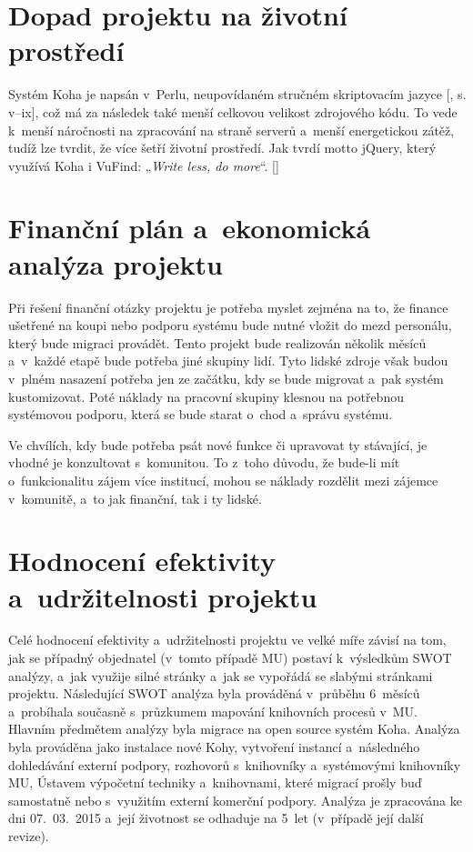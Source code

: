 \documentclass[
	11pt, oneside, printed, final, palatino
	microtype,
	table,   %
	lof,     %
	lot     %
]{fithesis3}
\makeatletter
\newcommand{\citepages}[2]{[\cite{#2}, s. #1]}
\newcommand{\citesource}[1]{[\cite{#1}]}
\newcommand{\citace}[1]{„\textit{#1}“} %
\makeatother
\begin{document}
{\section{Dopad projektu na životní prostředí}
Systém Koha je napsán v~Perlu, neupovídaném stručném skriptovacím jazyce \citepages{v–ix}{Wall1997}, což má za následek také menší celkovou velikost zdrojového kódu. To vede k~menší náročnosti na zpracování na straně serverů a~menší energetickou zátěž, tudíž lze tvrdit, že více šetří životní prostředí. Jak tvrdí motto jQuery, který využívá Koha i VuFind: \citace{Write less, do more}. \citesource{jquery_2016}

\section{Finanční plán a~ekonomická analýza projektu}
Při řešení finanční otázky projektu je potřeba myslet zejména na to, že finance ušetřené na koupi nebo podporu systému bude nutné vložit do mezd personálu, který bude migraci provádět. Tento projekt bude realizován několik měsíců a~v~každé etapě bude potřeba jiné skupiny lidí. Tyto lidské zdroje však budou v~plném nasazení potřeba jen ze začátku, kdy se bude migrovat a~pak systém kustomizovat. Poté náklady na pracovní skupiny klesnou na potřebnou systémovou podporu, která se bude starat o~chod a~správu systému.

Ve chvílích, kdy bude potřeba psát nové funkce či upravovat ty stávající, je vhodné je konzultovat s~komunitou. To z~toho důvodu, že bude-li mít o~funkcionalitu zájem více institucí, mohou se náklady rozdělit mezi zájemce v~komunitě, a~to jak finanční,  tak i ty lidské.

\section{Hodnocení efektivity a~udržitelnosti projektu}
Celé hodnocení efektivity a~udržitelnosti projektu ve velké míře závisí na tom, jak se případný objednatel (v~tomto případě MU) postaví k~výsledkům SWOT analýzy, a~jak využije silné stránky a~jak se vypořádá se slabými stránkami projektu. Následující SWOT analýza byla prováděná v~průběhu 6~měsíců a~probíhala současně s~průzkumem mapování knihovních procesů v~MU. Hlavním předmětem analýzy byla migrace na open source systém Koha. Analýza byla prováděna jako instalace nové Kohy, vytvoření instancí a~následného dohledávání externí podpory, rozhovorů s~knihovníky a~systémovými knihovníky MU, Ústavem výpočetní techniky a~knihovnami, které migrací prošly buď samostatně nebo s~využitím externí komerční podpory. Analýza je zpracována ke dni 07.~03.~2015 a~její životnost se odhaduje na 5~let (v~případě její další revize).

}
\end{document}
